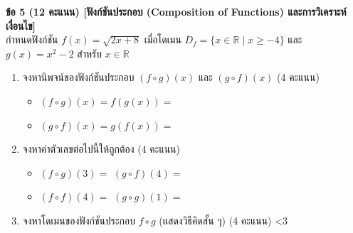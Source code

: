 \documentclass[a4paper,12pt]{article}
\newcounter{examline}
\newcommand{\examlines}[1]{%
  \setcounter{examline}{0}%
  \loop\ifnum\value{examline}<#1\relax
    \par\vspace{0.68em}\noindent\textcolor{gray!40}{\hrulefill}%
    \stepcounter{examline}%
  \repeat
}
\begin{document}
\noindent\textbf{ข้อ 5 (12 คะแนน) [ฟังก์ชันประกอบ (Composition of Functions) และการวิเคราะห์เงื่อนไข]} \\
กำหนดฟังก์ชัน $f(x) = \sqrt{2x + 8}$ เมื่อโดเมน $D_f = \{x \in \mathbb{R} \mid x \ge -4\}$ และ $g(x) = x^2 - 2$ สำหรับ $x \in \mathbb{R}$
\begin{enumerate}[label=5.\arabic*), itemsep=4pt]
  \item จงหานิพจน์ของฟังก์ชันประกอบ $(f \circ g)(x)$ และ $(g \circ f)(x)$ (4 คะแนน)
  \begin{itemize}[leftmargin=1.2cm, itemsep=2.5pt]
    \item $(f \circ g)(x) = f(g(x)) =$ \makebox[9.5cm]{\dotfill}
    \item $(g \circ f)(x) = g(f(x)) =$ \makebox[9.5cm]{\dotfill}
  \end{itemize}

  \item จงหาค่าตัวเลขต่อไปนี้ให้ถูกต้อง (4 คะแนน)
  \begin{itemize}[leftmargin=1.2cm, itemsep=2.5pt]
    \item $(f \circ g)(3) =$ \makebox[4.0cm]{\dotfill} \qquad\qquad $(g \circ f)(4) =$ \makebox[4.0cm]{\dotfill}
    \item $(f \circ f)(4) =$ \makebox[4.0cm]{\dotfill} \qquad\qquad $(g \circ g)(1) =$ \makebox[4.0cm]{\dotfill}
  \end{itemize}

  \item จงหาโดเมนของฟังก์ชันประกอบ $f \circ g$ (แสดงวิธีคิดสั้น ๆ) (4 คะแนน)
  \examlines{3}
\end{enumerate}
\vspace{0.6em}
\end{document}
